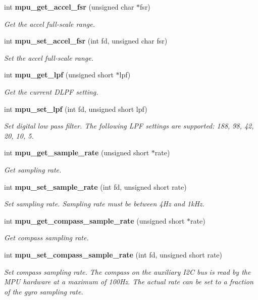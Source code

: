 \begin{DoxyCompactItemize}
int \textbf{ mpu\+\_\+get\+\_\+accel\+\_\+fsr} (unsigned char $\ast$fsr)
\begin{DoxyCompactList}\small\item\em Get the accel full-\/scale range. \end{DoxyCompactList}\item 
int \textbf{ mpu\+\_\+set\+\_\+accel\+\_\+fsr} (int fd, unsigned char fsr)
\begin{DoxyCompactList}\small\item\em Set the accel full-\/scale range. \end{DoxyCompactList}\item 
int \textbf{ mpu\+\_\+get\+\_\+lpf} (unsigned short $\ast$lpf)
\begin{DoxyCompactList}\small\item\em Get the current D\+L\+PF setting. \end{DoxyCompactList}\item 
int \textbf{ mpu\+\_\+set\+\_\+lpf} (int fd, unsigned short lpf)
\begin{DoxyCompactList}\small\item\em Set digital low pass filter. The following L\+PF settings are supported\+: 188, 98, 42, 20, 10, 5. \end{DoxyCompactList}\item 
int \textbf{ mpu\+\_\+get\+\_\+sample\+\_\+rate} (unsigned short $\ast$rate)
\begin{DoxyCompactList}\small\item\em Get sampling rate. \end{DoxyCompactList}\item 
int \textbf{ mpu\+\_\+set\+\_\+sample\+\_\+rate} (int fd, unsigned short rate)
\begin{DoxyCompactList}\small\item\em Set sampling rate. Sampling rate must be between 4\+Hz and 1k\+Hz. \end{DoxyCompactList}\item 
int \textbf{ mpu\+\_\+get\+\_\+compass\+\_\+sample\+\_\+rate} (unsigned short $\ast$rate)
\begin{DoxyCompactList}\small\item\em Get compass sampling rate. \end{DoxyCompactList}\item 
int \textbf{ mpu\+\_\+set\+\_\+compass\+\_\+sample\+\_\+rate} (int fd, unsigned short rate)
\begin{DoxyCompactList}\small\item\em Set compass sampling rate. The compass on the auxiliary I2C bus is read by the M\+PU hardware at a maximum of 100\+Hz. The actual rate can be set to a fraction of the gyro sampling rate. \end{DoxyCompactList}\item 

\end{DoxyCompactItemize}
